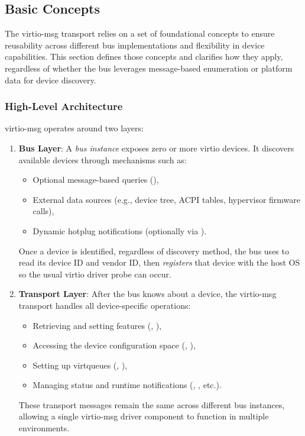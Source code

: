 \subsection{Basic Concepts}
\label{sec:Virtio Transport Options / Virtio Over Messages / Basic Concepts}

The virtio-msg transport relies on a set of foundational concepts to ensure
reusability across different bus implementations and flexibility in device
capabilities. This section defines those concepts and clarifies how they apply,
regardless of whether the bus leverages message-based enumeration or platform
data for device discovery.

\subsubsection{High-Level Architecture}

virtio-msg operates around two layers:

\begin{enumerate}
  \item \textbf{Bus Layer}: A \emph{bus instance} exposes zero or more virtio
        devices. It discovers available devices through mechanisms such as:
    \begin{itemize}
      \item Optional message-based queries (),
      \item External data sources (e.g., device tree, ACPI tables, hypervisor
        firmware calls),
      \item Dynamic hotplug notifications (optionally via ).
    \end{itemize}
    Once a device is identified, regardless of discovery method, the bus
    uses  to read its device ID and vendor ID, then
    \emph{registers} that device with the host OS so the usual virtio driver
    probe can occur.

  \item \textbf{Transport Layer}: After the bus knows about a device, the
        virtio-msg transport handles all device-specific operations:
    \begin{itemize}
      \item Retrieving and setting features (,
        ),
      \item Accessing the device configuration space (,
        ),
      \item Setting up virtqueues (, ),
      \item Managing status and runtime notifications (,
        , etc.).
    \end{itemize}
    These transport messages remain the same across different bus instances,
    allowing a single virtio-msg driver component to function in multiple
    environments.
\end{enumerate}

